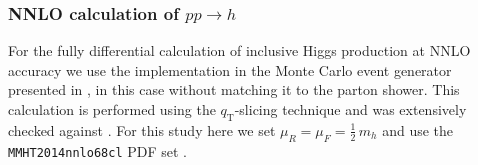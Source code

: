 \subsubsection{NNLO calculation of $pp\to h$}
\label{sec:hjetscomp:tools:fo:sherpa}

For the fully differential calculation of inclusive Higgs production 
at NNLO accuracy we use the implementation in the \hjetscompSherpa Monte Carlo 
event generator presented in \cite{Gleisberg:2008ta,Hoche:2014dla}, in 
this case without matching it to the parton shower. This calculation is 
performed using the $q_\text{T}$-slicing technique and was extensively 
checked against \hjetscompHNNLO \cite{Catani:2007vq}. For this study here we set 
$\mu_R=\mu_F=\tfrac{1}{2}\,m_h$ and use the \texttt{MMHT2014nnlo68cl} 
PDF set \cite{Harland-Lang:2014zoa}. 

